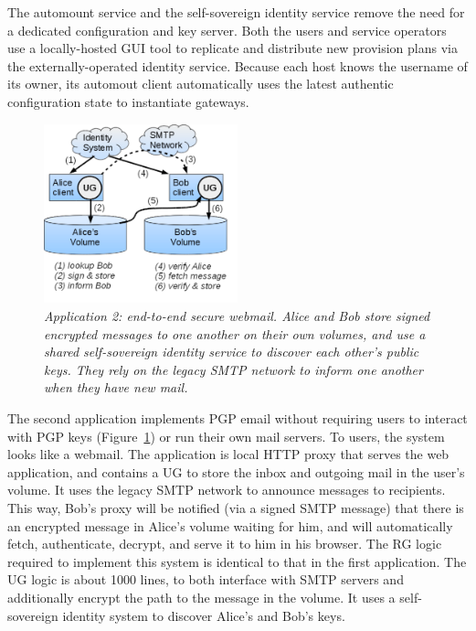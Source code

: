 The automount service and the self-sovereign identity service remove the need
for a dedicated configuration and key server.  Both the users and service
operators use a locally-hosted GUI tool to replicate and distribute new
provision plans via the externally-operated identity service.  Because each host knows
the username of its owner, its automout client automatically uses the latest
authentic configuration state to instantiate gateways.

\begin{figure}[t!]
\centering
\includegraphics[width=0.5\textwidth]{figures/secure-mail}
\caption{\it Application 2: end-to-end secure webmail. Alice and Bob store
   signed encrypted messages to one another on their own volumes, and use a
   shared self-sovereign identity service to discover each other's public keys.
   They rely on the legacy SMTP network to inform one another when they have new
   mail.}
\label{fig:secure-mail}
\end{figure}

The second application implements PGP email without requiring users to interact
with PGP keys (Figure~\ref{fig:secure-mail}) or run their own mail servers.
To users, the system looks like a webmail. The application is
local HTTP proxy that serves the web application, and contains a UG to store the
inbox and outgoing mail in the user's volume. It uses the legacy SMTP
network to announce messages to recipients. This way, Bob's proxy will be
notified (via a signed SMTP message) that there is an encrypted message in
Alice's volume waiting for him, and will automatically fetch, authenticate,
decrypt, and serve it to him in his browser. The RG logic required to implement
this system is identical to that in the first application. The UG logic is about
1000 lines, to both interface with SMTP servers and additionally encrypt the
path to the message in the volume. It uses a self-sovereign identity system to discover Alice's and
Bob's keys.

